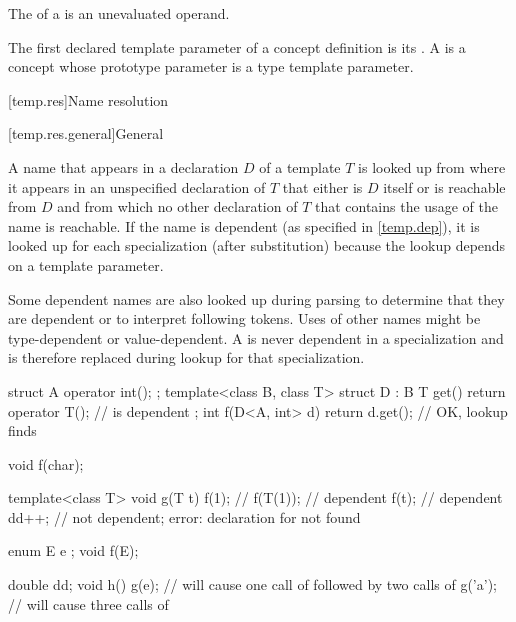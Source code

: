 \pnum
The  of a 
is an unevaluated operand.

\pnum
The first declared template parameter of a concept definition is its
.
%
A 
is a concept whose prototype parameter
is a type template parameter.

[temp.res]{Name resolution}

[temp.res.general]{General}

\pnum
A name that appears in a declaration $D$ of a template $T$ is looked up
from where it appears
in an unspecified declaration of $T$
that either is $D$ itself or is reachable from $D$ and
from which no other declaration of $T$
that contains the usage of the name is reachable.
If the name is dependent (as specified in \ref{temp.dep}),
it is looked up for each specialization (after substitution)
because the lookup depends on a template parameter.
\begin{note}
Some dependent names are also looked up during parsing to determine
that they are dependent or to interpret following \tcode{<} tokens.
Uses of other names might be type-dependent or
value-dependent.
A  is never dependent in a specialization and
is therefore replaced during lookup for that specialization.
\end{note}
\begin{example}
\begin{codeblock}
struct A { operator int(); };
template<class B, class T>
struct D : B {
  T get() { return operator T(); }      //  is dependent
};
int f(D<A, int> d) { return d.get(); }  // OK, lookup finds 
\end{codeblock}
\end{example}
\begin{example}
\begin{codeblock}
void f(char);

template<class T> void g(T t) {
  f(1);             // 
  f(T(1));          // dependent
  f(t);             // dependent
  dd++;             // not dependent; error: declaration for  not found
}

enum E { e };
void f(E);

double dd;
void h() {
  g(e);             // will cause one call of  followed by two calls of 
  g('a');           // will cause three calls of 
}
\end{codeblock}
\end{example}
